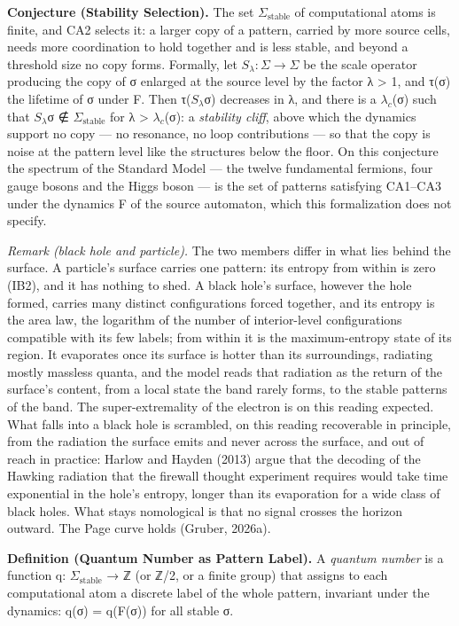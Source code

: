 \documentclass[
]{article}
\begin{document}
\textbf{Conjecture (Stability Selection).} The set
\(\Sigma_{\mathrm{stable}}\) of computational atoms is finite, and CA2
selects it: a larger copy of a pattern, carried by more source cells,
needs more coordination to hold together and is less stable, and beyond
a threshold size no copy forms. Formally, let
\(S_\lambda: \Sigma \to \Sigma\) be the scale operator producing the
copy of σ enlarged at the source level by the factor λ \textgreater{} 1,
and τ(σ) the lifetime of σ under F. Then τ(\(S_\lambda\)σ) decreases in
λ, and there is a \(\lambda_c\)(σ) such that \(S_\lambda\)σ ∉
\(\Sigma_{\mathrm{stable}}\) for λ \textgreater{} \(\lambda_c\)(σ): a
\emph{stability cliff}, above which the dynamics support no copy --- no
resonance, no loop contributions --- so that the copy is noise at the
pattern level like the structures below the floor. On this conjecture
the spectrum of the Standard Model --- the twelve fundamental fermions,
four gauge bosons and the Higgs boson --- is the set of patterns
satisfying CA1--CA3 under the dynamics F of the source automaton, which
this formalization does not specify.

\emph{Remark (black hole and particle).} The two members differ in what
lies behind the surface. A particle's surface carries one pattern: its
entropy from within is zero (IB2), and it has nothing to shed. A black
hole's surface, however the hole formed, carries many distinct
configurations forced together, and its entropy is the area law, the
logarithm of the number of interior-level configurations compatible with
its few labels; from within it is the maximum-entropy state of its
region. It evaporates once its surface is hotter than its surroundings,
radiating mostly massless quanta, and the model reads that radiation as
the return of the surface's content, from a local state the band rarely
forms, to the stable patterns of the band. The super-extremality of the
electron is on this reading expected. What falls into a black hole is
scrambled, on this reading recoverable in principle, from the radiation
the surface emits and never across the surface, and out of reach in
practice: Harlow and Hayden (2013) argue that the decoding of the
Hawking radiation that the firewall thought experiment requires would
take time exponential in the hole's entropy, longer than its evaporation
for a wide class of black holes. What stays nomological is that no
signal crosses the horizon outward. The Page curve holds (Gruber,
2026a).

\textbf{Definition (Quantum Number as Pattern Label).} A \emph{quantum
number} is a function q: \(\Sigma_{\mathrm{stable}}\) → ℤ (or ℤ/2, or a
finite group) that assigns to each computational atom a discrete label
of the whole pattern, invariant under the dynamics: q(σ) = q(F(σ)) for
all stable σ.
\end{document}

